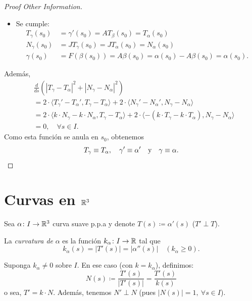 \begin{proof}[Proof Other Information]
\begin{itemize}
		\item Se cumple:
		\begin{align*}
			T_{\gamma}(s_{0}) &= \gamma'(s_{0}) = A T_{\beta}(s_{0}) = T_{\alpha}(s_{0}) \\
			N_{\gamma}(s_{0}) &= JT_{\gamma}(s_{0}) = JT_{\alpha}(s_{0}) = N_{\alpha}(s_{0}) \\
			\gamma(s_{0}) &= F(\beta(s_{0})) = A \beta(s_{0}) = \alpha(s_{0}) - A \beta(s_{0}) = \alpha(s_{0})
		.\end{align*}
	\end{itemize}
	Además,
	\begin{align*}
		& \frac{d}{ds}(|T_{\gamma} - T_{\alpha}|^{2} + |N_{\gamma} - N_{\alpha}|^{2}) \\
		&= 2 \cdot \langle T_{\gamma}' - T_{\alpha}', T_{\gamma} - T_{\alpha} \rangle + 2 \cdot \langle N_{\gamma}' - N_{\alpha}', N_{\gamma} - N_{\alpha} \rangle \\
		&= 2 \cdot \langle k \cdot N_{\gamma} - k \cdot N_{\alpha}, T_{\gamma} - T_{\alpha} \rangle + 2 \cdot \langle -(k \cdot T_{\gamma} - k \cdot T_{\alpha}), N_{\gamma} - N_{\alpha} \rangle \\
		&= 0,\quad \forall s \in I
	.\end{align*}
	Como esta función se anula en $s_{0}$, obtenemos
	\[ T_{\gamma} \equiv T_{\alpha},\quad \gamma' \equiv \alpha' \quad \text{y} \quad \gamma \equiv \alpha. \qedhere \]
\end{proof}

\section{Curvas en $\mathbb{R}^{3}$}

Sea $\alpha \colon I \to \mathbb{R}^{3}$ curva suave p.p.a y denote $T(s) \coloneq \alpha'(s)$ ($T' \perp T$).

\begin{definition}[curvatura]
	La \textit{curvatura de} $\alpha$ es la función $k_{\alpha} \colon I \to \mathbb{R}$ tal que
	\[ k_{\alpha}(s) = |T'(s)| = |\alpha''(s)| \quad (k_{\alpha} \geq 0). \]
\end{definition}

\begin{note}
	Suponga $k_{\alpha} \neq 0$ sobre $I$. En ese caso (con $k = k_{\alpha}$), definimos:
	\[ N(s) \coloneq \frac{T'(s)}{|T'(s)|} = \frac{T'(s)}{k(s)} \]
	o sea, $T' = k \cdot N$. Además, tenemos $N' \perp N$ (pues $|N(s)| = 1,\ \forall s \in I$).
\end{note}

